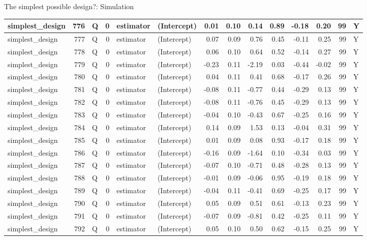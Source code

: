 \documentclass[
  11pt,
  ignorenonframetext,
]{beamer}
\begin{document}
\begin{frame}[fragile]{The simplest possible design?: Simulation}
\begin{tabular}{l|r|l|r|l|l|r|r|r|r|r|r|r|l}
\hline
simplest\_design & 776 & Q & 0 & estimator & (Intercept) & 0.01 & 0.10 & 0.14 & 0.89 & -0.18 & 0.20 & 99 & Y\\
\hline
simplest\_design & 777 & Q & 0 & estimator & (Intercept) & 0.07 & 0.09 & 0.76 & 0.45 & -0.11 & 0.25 & 99 & Y\\
\hline
simplest\_design & 778 & Q & 0 & estimator & (Intercept) & 0.06 & 0.10 & 0.64 & 0.52 & -0.14 & 0.27 & 99 & Y\\
\hline
simplest\_design & 779 & Q & 0 & estimator & (Intercept) & -0.23 & 0.11 & -2.19 & 0.03 & -0.44 & -0.02 & 99 & Y\\
\hline
simplest\_design & 780 & Q & 0 & estimator & (Intercept) & 0.04 & 0.11 & 0.41 & 0.68 & -0.17 & 0.26 & 99 & Y\\
\hline
simplest\_design & 781 & Q & 0 & estimator & (Intercept) & -0.08 & 0.11 & -0.77 & 0.44 & -0.29 & 0.13 & 99 & Y\\
\hline
simplest\_design & 782 & Q & 0 & estimator & (Intercept) & -0.08 & 0.11 & -0.76 & 0.45 & -0.29 & 0.13 & 99 & Y\\
\hline
simplest\_design & 783 & Q & 0 & estimator & (Intercept) & -0.04 & 0.10 & -0.43 & 0.67 & -0.25 & 0.16 & 99 & Y\\
\hline
simplest\_design & 784 & Q & 0 & estimator & (Intercept) & 0.14 & 0.09 & 1.53 & 0.13 & -0.04 & 0.31 & 99 & Y\\
\hline
simplest\_design & 785 & Q & 0 & estimator & (Intercept) & 0.01 & 0.09 & 0.08 & 0.93 & -0.17 & 0.18 & 99 & Y\\
\hline
simplest\_design & 786 & Q & 0 & estimator & (Intercept) & -0.16 & 0.09 & -1.64 & 0.10 & -0.34 & 0.03 & 99 & Y\\
\hline
simplest\_design & 787 & Q & 0 & estimator & (Intercept) & -0.07 & 0.10 & -0.71 & 0.48 & -0.28 & 0.13 & 99 & Y\\
\hline
simplest\_design & 788 & Q & 0 & estimator & (Intercept) & -0.01 & 0.09 & -0.06 & 0.95 & -0.19 & 0.18 & 99 & Y\\
\hline
simplest\_design & 789 & Q & 0 & estimator & (Intercept) & -0.04 & 0.11 & -0.41 & 0.69 & -0.25 & 0.17 & 99 & Y\\
\hline
simplest\_design & 790 & Q & 0 & estimator & (Intercept) & 0.05 & 0.09 & 0.51 & 0.61 & -0.13 & 0.23 & 99 & Y\\
\hline
simplest\_design & 791 & Q & 0 & estimator & (Intercept) & -0.07 & 0.09 & -0.81 & 0.42 & -0.25 & 0.11 & 99 & Y\\
\hline
simplest\_design & 792 & Q & 0 & estimator & (Intercept) & 0.05 & 0.10 & 0.50 & 0.62 & -0.15 & 0.25 & 99 & Y\\

\end{tabular}
\end{frame}
\end{document}
